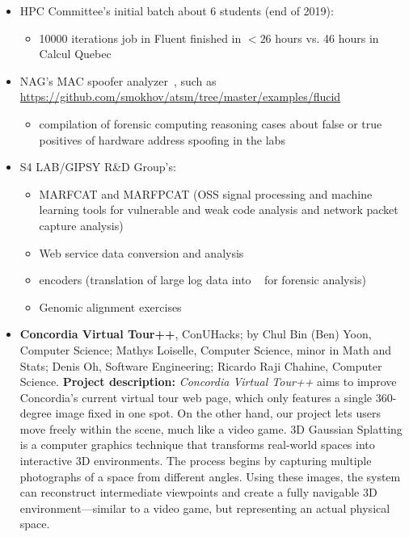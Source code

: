 \begin{itemize}
	\item HPC Committee's initial batch about 6 students (end of 2019):
	\begin{itemize}
		\item 10000 iterations job in Fluent finished in $<26$ hours vs. 46 hours in Calcul Quebec
	\end{itemize}

	\item NAG's MAC spoofer analyzer~\cite{mac-spoofer-analyzer-intro-c3s2e2014,mac-spoofer-analyzer-detail-fps2014},
	such as \url{https://github.com/smokhov/atsm/tree/master/examples/flucid}
	\begin{itemize}
		\item compilation of forensic computing reasoning cases about false or true positives of hardware address spoofing in the labs
	\end{itemize}

	\item S4 LAB/GIPSY R\&D Group's:
	\begin{itemize}
		\item MARFCAT and MARFPCAT (OSS signal processing and machine learning tools for
		vulnerable and weak code analysis and network packet capture
		analysis)~\cite{marfcat-nlp-ai2014,marfcat-sate2010-nist,fingerprinting-mal-traffic}
		\item Web service data conversion and analysis
		\item {\flucid} encoders (translation of large log data into {\flucid}~\cite{mokhov-phd-thesis-2013} for forensic analysis)
		\item Genomic alignment exercises
	\end{itemize}

	\item \textbf{Concordia Virtual Tour++}, ConUHacks; by
    Chul Bin (Ben) Yoon, Computer Science;
    Mathys Loiselle, Computer Science, minor in Math and Stats;
    Denis Oh, Software Engineering;
    Ricardo Raji Chahine, Computer Science.
    \textbf{Project description:}
    \textit{Concordia Virtual Tour++} aims to improve Concordia's current virtual tour web page,
    which only features a single 360-degree image fixed in one spot. On the other hand, our project
    lets users move freely within the scene, much like a video game.
    3D Gaussian Splatting is a computer graphics technique that transforms real-world spaces into interactive 3D environments.
    The process begins by capturing multiple photographs of a space from different angles. Using these images,
    the system can reconstruct intermediate viewpoints and create a fully navigable 3D environment—similar to a video game,
    but representing an actual physical space.


\end{itemize}
